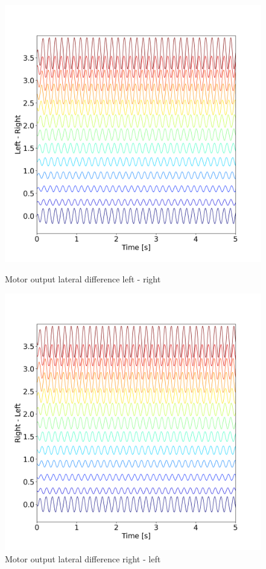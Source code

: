 \documentclass{cmc}
\begin{document}
\begin{figure}[H]
    \centering
    \begin{minipage}{0.38\textwidth}
        \centering
        \includegraphics[width=\linewidth]{our_figures/Lateral_Diff_ex5 _Left - Right.png}
        \caption{Motor output lateral difference left - right}
        \label{fig:Lateral_Diff_ex5_Left-Right}
    \end{minipage}
    \hfill
    \begin{minipage}{0.38\textwidth}
        \centering
        \includegraphics[width=\linewidth]{our_figures/Lateral_Diff_ex5 _Right - Left.png}
        \caption{Motor output lateral difference right - left}
        \label{fig:Lateral_Diff_ex5_Right-Left}
    \end{minipage}
\end{figure}
\end{document}
